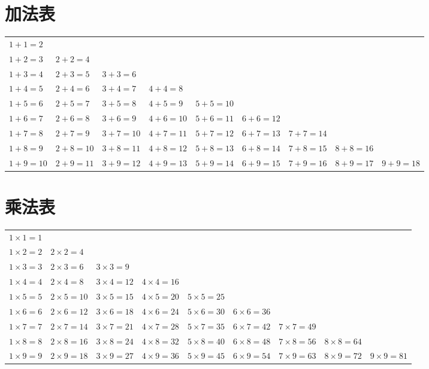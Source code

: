 \documentclass[24pt]{article}
\begin{document}
{
 \large
\section{加法表}

    {
    \begin{tabular}{ p{2cm}p{2cm}p{2cm}p{2cm}p{2cm}p{2cm}p{2cm}p{2cm}p{2cm} }
    
    $1 + 1 = 2$ &  &  &  &  &  &  &  & \\
$1 + 2 = 3$ & $2 + 2 = 4$ &  &  &  &  &  &  & \\
$1 + 3 = 4$ & $2 + 3 = 5$ & $3 + 3 = 6$ &  &  &  &  &  & \\
$1 + 4 = 5$ & $2 + 4 = 6$ & $3 + 4 = 7$ & $4 + 4 = 8$ &  &  &  &  & \\
$1 + 5 = 6$ & $2 + 5 = 7$ & $3 + 5 = 8$ & $4 + 5 = 9$ & $5 + 5 = 10$ &  &  &  & \\
$1 + 6 = 7$ & $2 + 6 = 8$ & $3 + 6 = 9$ & $4 + 6 = 10$ & $5 + 6 = 11$ & $6 + 6 = 12$ &  &  & \\
$1 + 7 = 8$ & $2 + 7 = 9$ & $3 + 7 = 10$ & $4 + 7 = 11$ & $5 + 7 = 12$ & $6 + 7 = 13$ & $7 + 7 = 14$ &  & \\
$1 + 8 = 9$ & $2 + 8 = 10$ & $3 + 8 = 11$ & $4 + 8 = 12$ & $5 + 8 = 13$ & $6 + 8 = 14$ & $7 + 8 = 15$ & $8 + 8 = 16$ & \\
$1 + 9 = 10$ & $2 + 9 = 11$ & $3 + 9 = 12$ & $4 + 9 = 13$ & $5 + 9 = 14$ & $6 + 9 = 15$ & $7 + 9 = 16$ & $8 + 9 = 17$ & $9 + 9 = 18$
    
    \end{tabular}
    }
    \section{乘法表}

    {
    \begin{tabular}{ p{2cm}p{2cm}p{2cm}p{2cm}p{2cm}p{2cm}p{2cm}p{2cm}p{2cm} }
    
    $1 \times 1 = 1$ &  &  &  &  &  &  &  & \\
$1 \times 2 = 2$ & $2 \times 2 = 4$ &  &  &  &  &  &  & \\
$1 \times 3 = 3$ & $2 \times 3 = 6$ & $3 \times 3 = 9$ &  &  &  &  &  & \\
$1 \times 4 = 4$ & $2 \times 4 = 8$ & $3 \times 4 = 12$ & $4 \times 4 = 16$ &  &  &  &  & \\
$1 \times 5 = 5$ & $2 \times 5 = 10$ & $3 \times 5 = 15$ & $4 \times 5 = 20$ & $5 \times 5 = 25$ &  &  &  & \\
$1 \times 6 = 6$ & $2 \times 6 = 12$ & $3 \times 6 = 18$ & $4 \times 6 = 24$ & $5 \times 6 = 30$ & $6 \times 6 = 36$ &  &  & \\
$1 \times 7 = 7$ & $2 \times 7 = 14$ & $3 \times 7 = 21$ & $4 \times 7 = 28$ & $5 \times 7 = 35$ & $6 \times 7 = 42$ & $7 \times 7 = 49$ &  & \\
$1 \times 8 = 8$ & $2 \times 8 = 16$ & $3 \times 8 = 24$ & $4 \times 8 = 32$ & $5 \times 8 = 40$ & $6 \times 8 = 48$ & $7 \times 8 = 56$ & $8 \times 8 = 64$ & \\
$1 \times 9 = 9$ & $2 \times 9 = 18$ & $3 \times 9 = 27$ & $4 \times 9 = 36$ & $5 \times 9 = 45$ & $6 \times 9 = 54$ & $7 \times 9 = 63$ & $8 \times 9 = 72$ & $9 \times 9 = 81$
    
    \end{tabular}
    }
    
}
\end{document}

